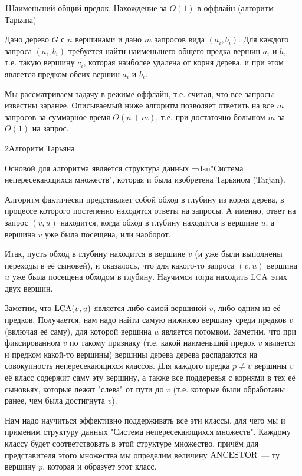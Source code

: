 \h1{Наименьший общий предок. Нахождение за $O(1)$ в оффлайн (алгоритм Тарьяна)}

Дано дерево $G$ с $n$ вершинами и дано $m$ запросов вида $(a_i, b_i)$. Для каждого запроса $(a_i, b_i)$ требуется найти наименьшего общего предка вершин $a_i$ и $b_i$, т.е. такую вершину $c_i$, которая наиболее удалена от корня дерева, и при этом является предком обеих вершин $a_i$ и $b_i$.

Мы рассматриваем задачу в режиме оффлайн, т.е. считая, что все запросы известны заранее. Описываемый ниже алгоритм позволяет ответить на все $m$ запросов за суммарное время $O(n+m)$, т.е. при достаточно большом $m$ за $O(1)$ на запрос.

\h2{Алгоритм Тарьяна}

Основой для алгоритма является структура данных \algohref=dsu{"Система непересекающихся множеств"}, которая и была изобретена Тарьяном (Tarjan).

Алгоритм фактически представляет собой обход в глубину из корня дерева, в процессе которого постепенно находятся ответы на запросы. А именно, ответ на запрос $(v,u)$ находится, когда обход в глубину находится в вершине $u$, а вершина $v$ уже была посещена, или наоборот.

Итак, пусть обход в глубину находится в вершине $v$ (и уже были выполнены переходы в её сыновей), и оказалось, что для какого-то запроса $(v,u)$ вершина $u$ уже была посещена обходом в глубину. Научимся тогда находить $\rm LCA$ этих двух вершин.

Заметим, что ${\rm LCA}(v,u)$ является либо самой вершиной $v$, либо одним из её предков. Получается, нам надо найти самую нижнюю вершину среди предков $v$ (включая её саму), для которой вершина $u$ является потомком. Заметим, что при фиксированном $v$ по такому признаку (т.е. какой наименьший предок $v$ является и предком какой-то вершины) вершины дерева дерева распадаются на совокупность непересекающихся классов. Для каждого предка $p \not= v$ вершины $v$ её класс содержит саму эту вершину, а также все поддеревья с корнями в тех её сыновьях, которые лежат "слева" от пути до $v$ (т.е. которые были обработаны ранее, чем была достигнута $v$).

Нам надо научиться эффективно поддерживать все эти классы, для чего мы и применим структуру данных "Система непересекающихся множеств". Каждому классу будет соответствовать в этой структуре множество, причём для представителя этого множества мы определим величину $\rm ANCESTOR$ --- ту вершину $p$, которая и образует этот класс.

